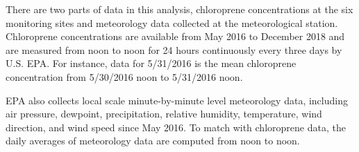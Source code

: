 \documentclass[12pt,]{article}
\newenvironment{Shaded}{\begin{snugshade}}{\end{snugshade}}
\newcommand{\KeywordTok}[1]{\textcolor[rgb]{0.13,0.29,0.53}{\textbf{#1}}}
\newcommand{\DataTypeTok}[1]{\textcolor[rgb]{0.13,0.29,0.53}{#1}}
\newcommand{\DecValTok}[1]{\textcolor[rgb]{0.00,0.00,0.81}{#1}}
\newcommand{\StringTok}[1]{\textcolor[rgb]{0.31,0.60,0.02}{#1}}
\newcommand{\CommentTok}[1]{\textcolor[rgb]{0.56,0.35,0.01}{\textit{#1}}}
\newcommand{\OperatorTok}[1]{\textcolor[rgb]{0.81,0.36,0.00}{\textbf{#1}}}
\newcommand{\NormalTok}[1]{#1}
\begin{document}
There are two parts of data in this analysis, chloroprene concentrations
at the six monitoring sites and meteorology data collected at the
meteorological station. Chloroprene concentrations are available from
May 2016 to December 2018 and are measured from noon to noon for 24
hours continuously every three days by U.S. EPA. For instance, data for
5/31/2016 is the mean chloroprene concentration from 5/30/2016 noon to
5/31/2016 noon.

EPA also collects local scale minute-by-minute level meteorology data,
including air pressure, dewpoint, precipitation, relative humidity,
temperature, wind direction, and wind speed since May 2016. To match
with chloroprene data, the daily averages of meteorology data are
computed from noon to noon.

\begin{Shaded}
\end{Shaded}
\end{document}
